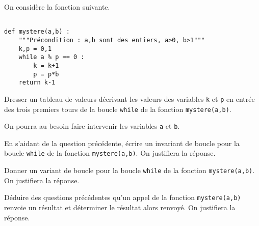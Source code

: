 \exer{}
\setcounter{numques}{0}

On considère la fonction suivante. 
\begin{lstlisting}

def mystere(a,b) :
    """Précondition : a,b sont des entiers, a>0, b>1"""
    k,p = 0,1
    while a % p == 0 :
        k = k+1
        p = p*b
    return k-1
\end{lstlisting}
    

\question{} Dresser un tableau de valeurs décrivant les valeurs des variables \texttt{k} et \texttt{p} en entrée des trois premiers tours de la boucle \texttt{while} de la fonction \texttt{mystere(a,b)}. 

On pourra au besoin faire intervenir les variables \texttt{a} et \texttt{b}. 

\medskip{}

\question{} En s'aidant de la question précédente, écrire un invariant de boucle pour la boucle \texttt{while} de la fonction \texttt{mystere(a,b)}. On justifiera la réponse. 

\medskip{}

\question{} Donner un variant de boucle pour la boucle \texttt{while} de la fonction \texttt{mystere(a,b)}. On justifiera la réponse. 

\medskip{}

\question{} Déduire des questions précédentes qu'un appel de la fonction \texttt{mystere(a,b)} renvoie un résultat et déterminer le résultat alors renvoyé. On justifiera la réponse. 
